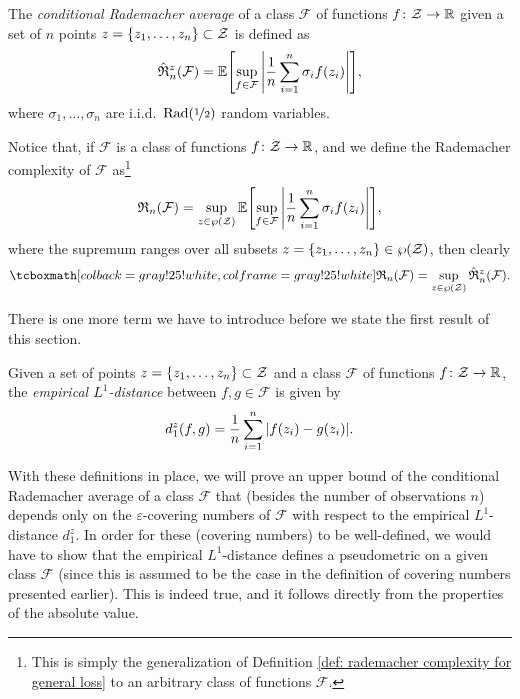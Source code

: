 \begin{definition}
The \emph{conditional Rademacher average} of a class $\mathcal{F}$ of functions $f \colon \mathcal{Z} \to \mathbb{R}$ given a set of $n$ points $z = \set{z_1, \dots, z_n} \subset \mathcal{Z}$ is defined as
\[
    \hat{\mathfrak{R}}_n^z(\mathcal{F}) = \Exp\left[\sup_{f \in \mathcal{F}} \abs{\frac{1}{n} \sum_{i=1}^n \sigma_i f(z_i)}\right],
\]
where $\sigma_1, \dots, \sigma_n$ are i.i.d.\ $\operatorname{Rad}(\nicefrac{1}{2})$ random variables.
\end{definition}

Notice that, if $\mathcal{F}$ is a class of functions $f \colon \mathcal{Z} \to \mathbb{R}$, and we define the Rademacher complexity of $\mathcal{F}$ as\footnote{This is simply the generalization of Definition \ref{def: rademacher complexity for general loss} to an arbitrary class of functions $\mathcal{F}$.}
\[
    \mathfrak{R}_n(\mathcal{F}) = \sup_{z \in \power(\mathcal{Z})} \Exp\left[\sup_{f \in \mathcal{F}} \abs{\frac{1}{n} \sum_{i=1}^n \sigma_i f(z_i)}\right],
\]
where the supremum ranges over all subsets $z = \set{z_1, \dots, z_n} \in \power(\mathcal{Z})$, then clearly
\begin{equation}
\label{eq: rademacher complexity and conditional rademacher average}
    \highlightMath{
        \mathfrak{R}_n(\mathcal{F}) = \sup_{z \in \power(\mathcal{Z})} \hat{\mathfrak{R}}_n^z(\mathcal{F}).
    }
\end{equation}

There is one more term we have to introduce before we state the first result of this section.

\begin{definition}
Given a set of points $z = \set{z_1, \dots, z_n} \subset \mathcal{Z}$ and a class $\mathcal{F}$ of functions $f \colon \mathcal{Z} \to \mathbb{R}$, the \emph{empirical $L^1$-distance} between $f, g \in \mathcal{F}$ is given by
\[
    d_1^z(f, g) = \frac{1}{n} \sum_{i=1}^n \abs{f(z_i) - g(z_i)}.
\]
\end{definition}

With these definitions in place, we will prove an upper bound of the conditional Rademacher average of a class $\mathcal{F}$ that (besides the number of observations $n$) depends only on the $\varepsilon$-covering numbers of $\mathcal{F}$ with respect to the empirical $L^1$-distance $d_1^z$. In order for these (covering numbers) to be well-defined, we would have to show that the empirical $L^1$-distance defines a pseudometric on a given class $\mathcal{F}$ (since this is assumed to be the case in the definition of covering numbers presented earlier). This is indeed true, and it follows directly from the properties of the absolute value.

